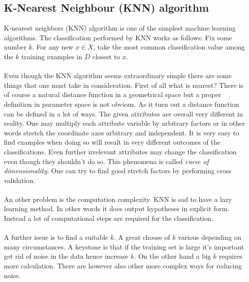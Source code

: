 \subsection{K-Nearest Neighbour (KNN) algorithm}
K-nearest neighbors (KNN) algorithm is one of the simplest machine learning
algorithms. The classification performed by KNN works as follows: Fix some
number $k$. For any new $x \in X$, take the most common classification value among
the $k$ training examples in $D$ closest to $x$.
\\\\
Even though the KNN algorithm
seems extraordinary simple there are some things that one must take in
consideration. First of all what is nearest? There is of course a natural
distance function in a geometrical space but a proper definition in parameter
space is not obvious. As it turn out a distance function can be defined in a lot
of ways. The given attributes are overall very different in reality.
One may multiply each attribute variable by arbitrary factors or in other
words stretch the coordinate axes arbitrary and independent. It is very easy to
find examples when doing so will result in very different outcomes of the classifications.
Even further irrelevant attributes may change the classification even though they
shouldn't do so. This phenomena is called \emph{curse of dimensionality}. One
can try to find good stretch factors by performing cross validation.
\\\\
An other problem is the computation complexity. KNN is sad to have a lazy
learning method. In other words it does output hypotheses in explicit form.
Instead a lot of computational steps are required for the classification.
\\\\
A further issue is to find a suitable $k$. A great choose of $k$ various
depending on many circumstances. A keystone is that if the training set is large
it's important get rid of noise in the data hence increase $k$. On the other
hand a big $k$ requires more calculation. There are however also other more
complex ways for reducing noise.
